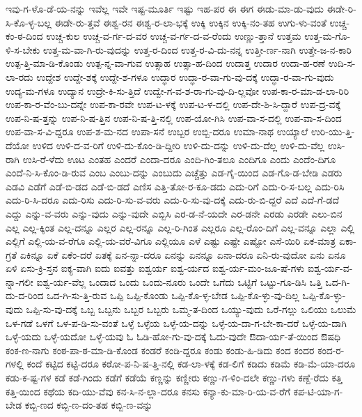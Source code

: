 {ಇವು-ಗ-ಳೊ-ಡೆ-ಯ-ನನ್ನು
ಇವೆಲ್ಲ
ಇವೇ
ಇಷ್ಟ-ಮೂರ್ತಿ
ಇಷ್ಟು
ಇಹ-ಪರ
ಈ
ಈಗ
ಈಡು-ಮಾ-ಡು-ವುದು
ಈಡೇ-ರಿ-ಸಿ-ಕೊ-ಳ್ಳ-ಬಲ್ಲ
ಈಡೇ-ರು-ತ್ತವೆ
ಈಶ್ವ-ರನ
ಈಶ್ವ-ರ-ಲಾ-ಭಕ್ಕೆ
ಉಕ್ಕಿ
ಉಕ್ಕಿನ
ಉಕ್ಕಿ-ನಂ-ತಹ
ಉಗು-ಳು-ವಂತೆ
ಉಚ್ಚ-ಕಂ-ಠ-ದಿಂದ
ಉಚ್ಚ-ಕುಲ
ಉಚ್ಚ-ವ-ರ್ಗ-ದ-ವರ
ಉಚ್ಚ-ವ-ರ್ಗ-ದ-ವ-ರೆಂದು
ಉಣ್ಣು-ತ್ತಾನೆ
ಉತ್ತಮ
ಉತ್ತ-ಮ-ಗೊ-ಳಿ-ಸ-ಬೇಕು
ಉತ್ತ-ಮ-ವಾ-ಗಿ-ರು-ವುದನ್ನು
ಉತ್ತ-ರ-ದಿಂದ
ಉತ್ತ-ರ-ವಿ-ದು-ನನ್ನ
ಉತ್ತೀ-ರ್ಣ-ನಾಗಿ
ಉತ್ತೇ-ಜ-ನ-ಕಾರಿ
ಉತ್ಪ-ತ್ತಿ-ಮಾ-ಡಿ-ಕೊಂಡು
ಉತ್ಪ-ನ್ನ-ವಾ-ಗುವ
ಉತ್ಸಾಹ
ಉತ್ಸಾ-ಹ-ದಿಂದ
ಉದಾತ್ತ
ಉದಾರ
ಉದಾ-ಹ-ರಣೆ
ಉದಿ-ಸ-ಲಾ-ರದು
ಉದ್ದೇಶ
ಉದ್ದೇ-ಶಕ್ಕೆ
ಉದ್ದೇ-ಶ-ಗಳೂ
ಉದ್ಧಾರ
ಉದ್ಧಾ-ರ-ವಾ-ಗು-ವು-ದಕ್ಕೆ
ಉದ್ಧಾ-ರ-ವಾ-ಗು-ವುದು
ಉದ್ಯ-ಮ-ಗಳೂ
ಉದ್ಯಾನ
ಉದ್ರೇ-ಕಿ-ಸು-ತ್ತಿದೆ
ಉದ್ವೇ-ಗ-ವ-ಶ-ರಾ-ಗು-ವು-ದಿ-ಲ್ಲವೋ
ಉಪ-ಕಾ-ರ-ಮಾ-ಡ-ಲಾ-ರಿರಿ
ಉಪ-ಕಾ-ರ-ವೆಂ-ಬು-ದನ್ನೇ
ಉಪ-ಕಾ-ರವೇ
ಉಪ-ಟ-ಳಕ್ಕೆ
ಉಪ-ಟ-ಳ-ದಲ್ಲಿ
ಉಪ-ದೇ-ಶಿ-ಸಿ-ದ್ದಾರೆ
ಉಪ-ದ್ರ-ವಕ್ಕೆ
ಉಪ-ನಿ-ಷ-ತ್ತನ್ನು
ಉಪ-ನಿ-ಷ-ತ್ತಿನ
ಉಪ-ನಿ-ಷ-ತ್ತಿ-ನಲ್ಲಿ
ಉಪ-ಯೋ-ಗಿಸಿ
ಉಪ-ವಾ-ಸ-ದಲ್ಲಿ
ಉಪ-ವಾ-ಸ-ದಿಂದ
ಉಪ-ವಾ-ಸ-ವಿ-ದ್ದರೂ
ಉಪ-ಶ-ಮ-ನದ
ಉಪಾ-ಸನೆ
ಉಬ್ಬರ
ಉಬ್ಬಿ-ದರೂ
ಉಮಾ-ನಾಥ
ಉಯ್ಯಾಲೆ
ಉರಿ-ಯು-ತ್ತಿ-ದೆಯೋ
ಉಳಿದ
ಉಳಿ-ದ-ವ-ರಿಗೆ
ಉಳಿ-ದು-ಕೊಂ-ಡಿ-ದ್ದೀರಿ
ಉಳಿ-ದು-ದನ್ನು
ಉಳಿ-ದು-ದೆಲ್ಲ
ಉಳಿ-ದು-ವೆಲ್ಲ
ಉಸಿ-ರಾಗಿ
ಉಸಿ-ರೆ-ಳೆದು
ಊಟ
ಎಂತಹ
ಎಂದರೆ
ಎಂದಾ-ದರೂ
ಎಂದಿ-ಗಿಂ-ತಲೂ
ಎಂದಿಗೂ
ಎಂದು
ಎಂದೆಂ-ದಿಗೂ
ಎಂದೆ-ನಿ-ಸಿ-ಕೊಂ-ಡಿ-ರುವ
ಎಂಬ
ಎಂಬು-ದನ್ನು
ಎಂಬುದು
ಎಚ್ಚೆತ್ತು
ಎಡ-ಗೈ-ಯಿಂದ
ಎಡ-ಗೊ-ಡ-ಬೇಡಿ
ಎಡರು
ಎಡವಿ
ಎಡೆಗೆ
ಎಡೆ-ಬಿ-ಡದ
ಎಡೆ-ಬಿ-ಡದೆ
ಎಣಿಸ
ಎತ್ತಿ-ತೋ-ರ-ಕೂ-ಡದು
ಎದು-ರಿಗೆ
ಎದು-ರಿ-ಸ-ಬಲ್ಲ
ಎದು-ರಿಸಿ
ಎದು-ರಿ-ಸಿ-ದರೂ
ಎದು-ರಿಸು
ಎದು-ರಿ-ಸು-ವ-ವರು
ಎದು-ರಿ-ಸು-ವು-ದಕ್ಕೆ
ಎದು-ರು-ಬಿ-ದ್ದರೆ
ಎದೆ
ಎದೆ-ಗೆ-ಡದೆ
ಎದ್ದು
ಎನ್ನು-ವ-ವರು
ಎನ್ನು-ವುದು
ಎನ್ನು-ವುದೇ
ಎಬ್ಬಿಸಿ
ಎರ-ಡ-ನೆ-ಯದೇ
ಎರ-ಡನೇ
ಎರಡು
ಎರಡೇ
ಎಲು-ಬಿನ
ಎಲ್ಲ
ಎಲ್ಲ-ಕ್ಕಿಂತ
ಎಲ್ಲ-ದನ್ನೂ
ಎಲ್ಲರ
ಎಲ್ಲ-ರನ್ನೂ
ಎಲ್ಲ-ರಿ-ಗಿಂತ
ಎಲ್ಲರೂ
ಎಲ್ಲ-ರೊಂ-ದಿಗೆ
ಎಲ್ಲ-ವನ್ನೂ
ಎಲ್ಲಾ
ಎಲ್ಲಿ
ಎಲ್ಲಿಗೆ
ಎಲ್ಲಿ-ಯ-ವ-ರೆಗೂ
ಎಲ್ಲಿ-ಯ-ವರೆ-ವಿಗೂ
ಎಲ್ಲಿಯೂ
ಎಳೆ
ಎಷ್ಟು
ಎಷ್ಟೇ
ಎಷ್ಟೋ
ಎಸೆ-ಯಿರಿ
ಏಕ-ಮಾತ್ರ
ಏಕಾ-ಗ್ರತೆ
ಏಕಿನ್ನೂ
ಏಕೆ
ಏಕೆಂ-ದರೆ
ಏತಕ್ಕೆ
ಏನ-ನ್ನಾ-ದರೂ
ಏನನ್ನು
ಏನನ್ನೂ
ಏನಾ-ದರೂ
ಏನಿ-ರು-ವುದೋ
ಏನು
ಏನೂ
ಏಳಿ
ಏಸು-ಕ್ರಿ-ಸ್ತನ
ಐಕ್ಯ-ವಾಗಿ
ಐದು
ಐವತ್ತು
ಐಶ್ವರ್ಯ
ಐಶ್ವ-ರ್ಯದ
ಐಶ್ವ-ರ್ಯ-ಮಂ-ಜೂ-ಷೆ-ಗಳು
ಐಶ್ವ-ರ್ಯ-ವ-ನ್ನಾ-ಗಲೀ
ಐಶ್ವ-ರ್ಯ-ವೆಲ್ಲ
ಒಂದಾದ
ಒಂದು
ಒಂದು-ನೂರು
ಒಂದೇ
ಒಗೆದು
ಒಟ್ಟಿಗೆ
ಒಟ್ಟು-ಗೂ-ಡಿಸಿ
ಒತ್ತಿ
ಒದ-ಗಿ-ದು-ದ-ರಿಂದ
ಒದ-ಗಿ-ಸು-ತ್ತಿ-ರುವ
ಒಪ್ಪಿ
ಒಪ್ಪಿ-ಕೊಂಡು
ಒಪ್ಪಿ-ಕೊ-ಳ್ಳ-ಬೇಡ
ಒಪ್ಪಿ-ಕೊ-ಳ್ಳು-ವು-ದಿಲ್ಲ
ಒಪ್ಪಿ-ಕೊ-ಳ್ಳು-ವುದು
ಒಪ್ಪಿ-ಸು-ವು-ದಕ್ಕೆ
ಒಬ್ಬ
ಒಬ್ಬನು
ಒಬ್ಬರ
ಒಬ್ಬರು
ಒಮ್ಮ-ತ-ದಿಂದ
ಒಯ್ಯು-ವುದು
ಒರೆ-ಗಲ್ಲು
ಒಲಿಯು
ಒಲುಮೆ
ಒಳ-ಗಡೆ
ಒಳಗೆ
ಒಳ-ಪ-ಡಿ-ಸು-ವಂತೆ
ಒಳ್ಳೆ
ಒಳ್ಳೆಯ
ಒಳ್ಳೆ-ಯ-ದನ್ನು
ಒಳ್ಳೆ-ಯ-ದಾ-ಗ-ಬೇ-ಕಾ-ದರೆ
ಒಳ್ಳೆ-ಯ-ದಾಗಿ
ಒಳ್ಳೆ-ಯದು
ಒಳ್ಳೆ-ಯದೋ
ಒಳ್ಳೆ-ಯವು
ಓ
ಓಡಿ-ಹೋ-ಗು-ವು-ದಕ್ಕೆ
ಓದು-ವುದೇ
ಔದಾ-ರ್ಯ-ತೆ-ಯಿಂದ
ಔಷಧಿ
ಕಂಕ-ಣ-ನಾಗು
ಕಂಠ-ಪಾ-ಠ-ಮಾ-ಡಿ-ಕೊಂಡ
ಕಂಡರೆ
ಕಂಡಿ-ದ್ದರೂ
ಕಂಡು
ಕಂಡು-ಹಿ-ಡಿದು
ಕಂದ
ಕಂದರ
ಕಂದ-ರ-ಗಳಲ್ಲಿ
ಕಂದೆ
ಕಟ್ಟಿದ
ಕಟ್ಟಿ-ದರೂ
ಕಠೋ-ಪ-ನಿ-ಷ-ತ್ತಿ-ನಲ್ಲಿ
ಕಡ-ಲಾ-ಳಕ್ಕೆ
ಕಡ-ಲಿಗೆ
ಕಡಿದು
ಕಡಿಮೆ
ಕಡಿ-ಮೆ-ಯಾ-ದರೂ
ಕಡು-ಕ-ಷ್ಟ-ಗಳ
ಕಡೆ
ಕಡೆ-ಗಿಂದು
ಕಡೆಗೆ
ಕಡೆಯೆ
ಕಣ್ಣನ್ನು
ಕಣ್ಣೀರು
ಕಣ್ಣು-ಗ-ಳಿಂ-ದಲೇ
ಕಣ್ಣು-ಗಳು
ಕಣ್ದೆ-ರೆದು
ಕತ್ತಿ
ಕತ್ತಿ-ಯಿಂದ
ಕಥೆಯ
ಕದಿ-ಯು-ವೆವು
ಕನ-ಸಿ-ನ-ಲ್ಲಾ-ದರೂ
ಕನಸು
ಕನ್ಯಾ-ಕು-ಮಾ-ರಿ-ಯ-ವ-ರೆಗೆ
ಕಪ-ಟಿ-ಯಾ-ಗ-ಬೇಡ
ಕಬ್ಬಿ-ಣದ
ಕಬ್ಬಿ-ಣ-ದಂ-ತಹ
ಕಬ್ಬಿ-ಣ-ವನ್ನು
}
